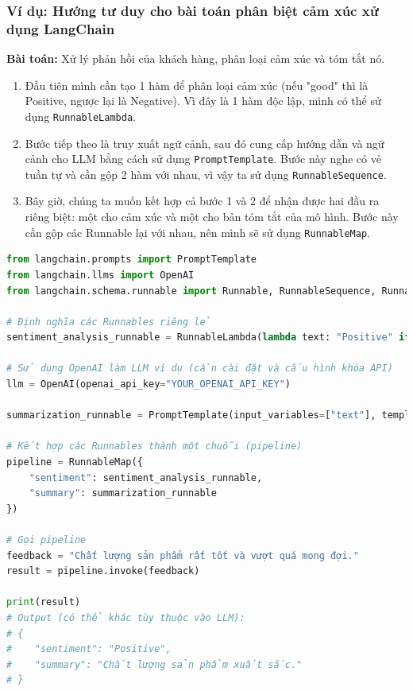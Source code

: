\documentclass[11pt]{article}
\begin{document}
\subsubsection{Ví dụ: Hướng tư duy cho bài toán phân biệt cảm xúc xử dụng LangChain}
\begin{boxC}
    \textbf{Bài toán:} Xử lý phản hồi của khách hàng, phân loại cảm xúc và tóm tắt nó.
    \begin{enumerate}
        \item Đầu tiên mình cần tạo 1 hàm dể phân loại cảm xúc (nếu "good" thì là Positive, ngược lại là Negative). Vì đây là 1 hàm độc lập, mình có thể sử dụng \texttt{RunnableLambda}.
        \item Bước tiếp theo là truy xuất ngữ cảnh, sau đó cung cấp hướng dẫn và ngữ cảnh cho LLM bằng cách sử dụng \texttt{PromptTemplate}. Bước này nghe có vẻ tuần tự và cần gộp 2 hàm với nhau, vì vậy ta sử dụng \texttt{RunnableSequence}.
        \item Bây giờ, chúng ta muốn kết hợp cả bước 1 và 2 để nhận được hai đầu ra riêng biệt: một cho cảm xúc và một cho bản tóm tắt của mô hình. Bước này cần gộp các Runnable lại với nhau, nên mình sẽ sử dụng \texttt{RunnableMap}.
    \end{enumerate}
    \begin{lstlisting}[language=Python, caption=Ví dụ về quy trình làm việc kết hợp các Runnable]
from langchain.prompts import PromptTemplate
from langchain.llms import OpenAI
from langchain.schema.runnable import Runnable, RunnableSequence, RunnableMap, RunnableLambda

# Định nghĩa các Runnables riêng lẻ
sentiment_analysis_runnable = RunnableLambda(lambda text: "Positive" if "good" in text.lower() else "Negative")

# Sử dụng OpenAI làm LLM ví dụ (cần cài đặt và cấu hình khóa API)
llm = OpenAI(openai_api_key="YOUR_OPENAI_API_KEY")

summarization_runnable = PromptTemplate(input_variables=["text"], template="Tóm tắt đoạn văn này: {text}") | llm # | đại diện cho RunnableSequence

# Kết hợp các Runnables thành một chuỗi (pipeline)
pipeline = RunnableMap({
    "sentiment": sentiment_analysis_runnable,
    "summary": summarization_runnable
})

# Gọi pipeline
feedback = "Chất lượng sản phẩm rất tốt và vượt quá mong đợi."
result = pipeline.invoke(feedback)

print(result)
# Output (có thể khác tùy thuộc vào LLM):
# {
#    "sentiment": "Positive",
#    "summary": "Chất lượng sản phẩm xuất sắc."
# }
    \end{lstlisting}
\end{boxC}
\end{document}

